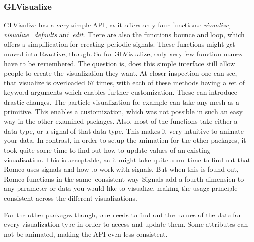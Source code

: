 \subsubsection{GLVisualize}
GLVisulize has a very simple API, as it offers only four functions: \textit{visualize}, \textit{visualize\_defaults} and \textit{edit}.
There are also the functions bounce and loop, which offers a simplification for creating periodic signals.
These functions might get moved into Reactive, though.
So for GLVisualize, only very few function names have to be remembered.
The question is, does this simple interface still allow people to create the visualization they want.
At closer inspection one can see, that visualize is overloaded 67 times, with each of these methods having a set of keyword arguments which enables further customization.
These can introduce drastic changes. The particle visualization for example can take any mesh as a primitive. This enables a customization, which was not possible in such an easy way in the other examined packages.
Also, most of the functions take either a data type, or a signal of that data type.
This makes it very intuitive to animate your data. 
In contrast, in order to setup the animation for the other packages, it took quite some time to find out how to update values of an existing visualization. This is acceptable, as it might take quite some time to find out that Romeo uses signals and how to work with signals.
But when this is found out, Romeo functions in the same, consistent way. Signals add a fourth dimension to any parameter or data you would like to visualize, making the usage principle consistent across the different visualizations.

For the other packages though, one needs to find out the names of the data for every visualization type in order to access and update them. Some attributes can not be animated, making the API even less consistent.

